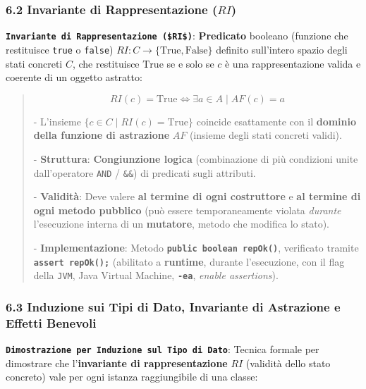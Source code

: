 \subsubsection{6.2 Invariante di Rappresentazione \texorpdfstring{($RI$)}{(RI)}}\label{6-2-invariante-di-rappresentazione-ri}

\textbf{\texttt{Invariante di Rappresentazione (\$RI\$)}}: \textbf{Predicato} booleano (funzione che restituisce \texttt{true} o \texttt{false}) $RI : C \to \{\text{True}, \text{False}\}$ definito sull'intero spazio degli stati concreti $C$, che restituisce $\text{True}$ se e solo se $c$ è una rappresentazione valida e coerente di un oggetto astratto:

\begin{quote}\small



\[

RI(c) = \text{True} \iff \exists a \in A \mid AF(c) = a

\]



- L'insieme $\{c \in C \mid RI(c) = \text{True}\}$ coincide esattamente con il \textbf{dominio della funzione di astrazione} $AF$ (insieme degli stati concreti validi).

- \textbf{Struttura}: \textbf{Congiunzione logica} (combinazione di più condizioni unite dall'operatore \texttt{AND} / \texttt{\&\&}) di predicati sugli attributi.

- \textbf{Validità}: Deve valere \textbf{al termine di ogni costruttore} e \textbf{al termine di ogni metodo pubblico} (può essere temporaneamente violata \emph{durante} l'esecuzione interna di un \textbf{mutatore}, metodo che modifica lo stato).

- \textbf{Implementazione}: Metodo \textbf{\texttt{public boolean repOk()}}, verificato tramite \textbf{\texttt{assert repOk();}} (abilitato a \textbf{runtime}, durante l'esecuzione, con il flag della \texttt{JVM}, Java Virtual Machine, \textbf{\texttt{-ea}}, \emph{enable assertions}).

\end{quote}

\subsubsection{6.3 Induzione sui Tipi di Dato, Invariante di Astrazione e Effetti Benevoli}\label{6-3-induzione-sui-tipi-di-dato-invariante-di-astrazione-e-effetti-benevoli}

\textbf{\texttt{Dimostrazione per Induzione sul Tipo di Dato}}: Tecnica formale per dimostrare che l'\textbf{invariante di rappresentazione} $RI$ (validità dello stato concreto) vale per ogni istanza raggiungibile di una classe:

